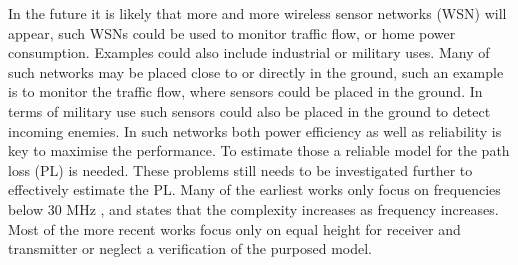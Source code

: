 
In the future it is likely that more and more wireless sensor networks (WSN) will appear, such WSNs could be used to monitor traffic flow, or home power consumption. Examples could also include industrial or military uses. Many of such networks may be placed close to or directly in the ground, such an example is to monitor the traffic flow, where sensors could be placed in the ground. In terms of military use such sensors could also be placed in the ground to detect incoming enemies. In such networks both power efficiency as well as reliability is key to maximise the performance. To estimate those a reliable model for the path loss (PL) is needed. %
These problems still needs to be investigated further to effectively estimate the PL. Many of the earliest works only focus on frequencies below 30 MHz \cite{Bullington}, and states that the complexity increases as frequency increases. Most of the more recent works focus only on equal height for receiver and transmitter or neglect a verification of the purposed model. 


